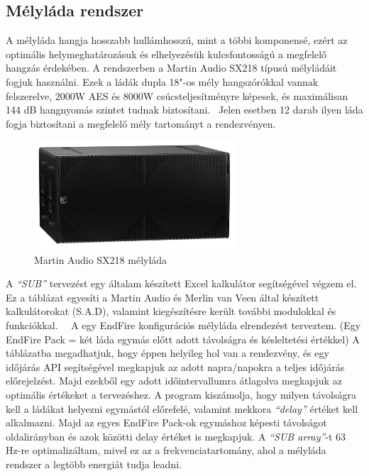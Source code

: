 \subsection{Mélyláda rendszer}
A mélyláda hangja hosszabb hullámhosszú, mint a többi komponensé, ezért az
optimális helymeghatározásuk és elhelyezésük kulcsfontosságú a megfelelő
hangzás érdekében. 
A rendszerben a Martin Audio SX218 típusú mélyládáit fogjuk használni.
Ezek a ládák dupla 18"-os mély hangszórókkal vannak felszerelve, 2000W AES és 8000W csúcsteljesítményre képesek, és
maximálisan 144 dB hangnyomás szintet tudnak biztosítani.~\cite{SXSUBWOOFERUSERGUIDE}
Jelen esetben 12 darab ilyen láda fogja biztosítani a megfelelő mély tartományt a rendezvényen.
\begin{figure}[H]
	\centering
	\includegraphics[width=75mm, keepaspectratio]{figures/sx218_front_view.jpg}
	\caption{Martin Audio SX218 mélyláda}\label{fig:sx218}
\end{figure}
A \textit{``SUB''} tervezést egy általam készített Excel kalkulátor
segítségével végzem el. Ez a táblázat egyesíti a Martin Audio és Merlin van Veen által
készített kalkulátorokat (S.A.D), valamint kiegészítésre került további modulokkal és funkciókkal.~\cite{MERLINVANVEEN}~\cite{MARTINSUBCALCULATOR}
A egy EndFire konfigurációs mélyláda elrendezést terveztem. 
(Egy EndFire Pack = két láda egymás előtt adott távolságra és késleltetési értékkel) 
A táblázatba megadhatjuk, hogy éppen helyileg hol
van a rendezvény, és egy időjárás API segítségével megkapjuk az adott napra/napokra a
teljes időjárás előrejelzést. Majd ezekből egy adott időintervallumra átlagolva
megkapjuk az optimális értékeket a tervezéshez. 
A program kiszámolja, hogy milyen távolságra kell a ládákat helyezni egymástól előrefelé,
valamint mekkora \textit{``delay''} értéket kell alkalmazni. 
Majd az egyes EndFire Pack-ok egymáshoz képesti távolságot oldalirányban és azok
közötti delay értéket is megkapjuk. A \textit{``SUB array''}-t 63 Hz-re optimalizáltam, mivel
ez az a frekvenciatartomány, ahol a mélyláda rendszer a legtöbb energiát tudja leadni.
